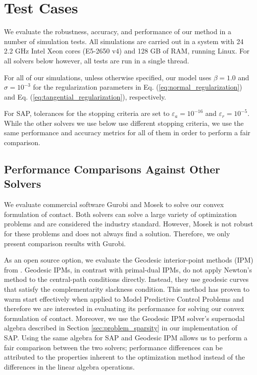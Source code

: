 \section{Test Cases}
\label{sec:test_cases}

We evaluate the robustness, accuracy, and performance of our method in a number
of simulation tests. All simulations are carried out in a system with 24 2.2
GHz Intel Xeon cores (E5-2650 v4) and 128 GB of RAM, running Linux. For all
solvers below however, all tests are run in a single thread.

For all of our simulations, unless otherwise specified, our model uses
$\beta=1.0$ and $\sigma=10^{-3}$ for the regularization parameters in Eq. (\ref{eq:normal_regularization}) and Eq. (\ref{eq:tangential_regularization}), respectively.

For SAP, tolerances for the stopping criteria are set to
$\varepsilon_a=10^{-16}$ and $\varepsilon_r=10^{-5}$. While the other solvers we use below use different stopping criteria, we use the same performance and accuracy metrics for all of them in order to perform a fair comparison.

\subsection{Performance Comparisons Against Other Solvers}
\label{sec:about_solvers}

We evaluate commercial software Gurobi and Mosek to solve our convex
formulation of contact. Both solvers can solve a large variety of optimization
problems and are considered the industry standard. However, Mosek is not robust
for these problems and does not always find a solution. Therefore, we only present
comparison results with Gurobi.

As an open source option, we evaluate the Geodesic interior-point methods (IPM)
from \cite{bib:permenter2020}. Geodesic IPMs, in contrast with primal-dual
IPMs, do not apply Newton's method to the central-path conditions directly.
Instead, they use geodesic curves that satisfy the complementarity slackness
condition. This method has proven to warm start effectively when applied to
Model Predictive Control Problems \cite{bib:permenter2020} and therefore we are
interested in evaluating its performance for solving our convex formulation of
contact. Moreover, we use the Geodesic IPM solver's supernodal algebra described
in Section \ref{sec:problem_sparsity} in our implementation of SAP. Using the
same algebra for SAP and Geodesic IPM allows us to perform a fair comparison between
the two solvers; performance differences can be attributed to the properties
inherent to the optimization method instead of the differences in the linear
algebra operations.

